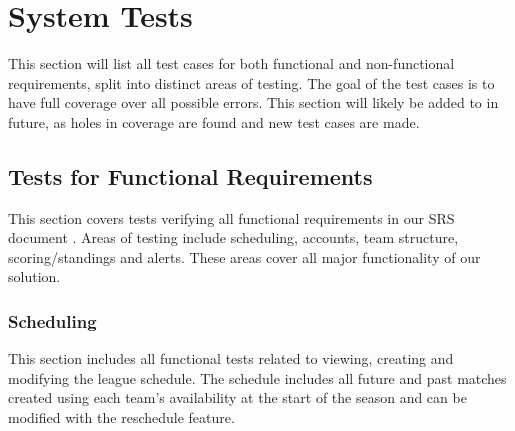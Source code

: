 \documentclass[12pt, titlepage]{article}
\begin{document}
\section{System Tests}


This section will list all test cases for both functional and non-functional
requirements, split into distinct areas of testing. The goal of the test cases
is to have full coverage over all possible errors. This section will likely be
added to in future, as holes in coverage are found and new test cases are
made.

\subsection{Tests for Functional Requirements}




This section covers tests verifying all functional requirements in our SRS
document \cite{SRS}. Areas of testing include scheduling, accounts, team
structure, scoring/standings and alerts. These areas cover all major
functionality of our solution.

\subsubsection{Scheduling}

This section includes all functional tests related to viewing, creating and
modifying the league schedule. The schedule includes all future and past
matches created using each team's availability at the start of the season and
can be modified with the reschedule feature.
\end{document}
